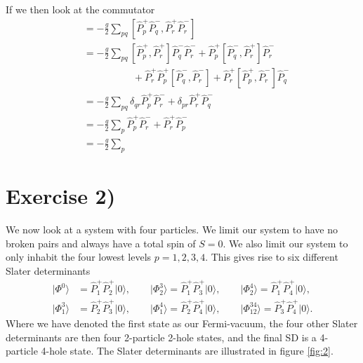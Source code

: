 \documentclass[a4paper, 11pt, notitlepage, english]{article}
\newcommand{\ket}[1]{|#1 \rangle}
\newcommand{\op}[1]{\hat{#1}}
\begin{document}
If we then look at the commutator
\begin{align*}
[\op{V}, \op{P}_r^+\op{P}_r^-] &= -\frac{g}{2}\sum_{pq} [\op{P}_p^+\op{P}_q^-, \op{P}_r^+\op{P}_r^-] \\
&= -\frac{g}{2}\sum_{pq} 
[\op{P}_p^+, \op{P}_r^+]\op{P}_q^-\op{P}_r^-
+\op{P}_p^+[\op{P}_q^-, \op{P}_r^+]\op{P}_r^- \\[-0.2cm]
&\qquad\qquad\quad +\op{P}_r^+\op{P}_p^+[\op{P}_q^-, \op{P}_r^-]
+\op{P}_r^+[\op{P}_p^+, \op{P}_r^-]\op{P}_q^- \\[0.1cm]
&= -\frac{g}{2}\sum_{pq} \delta_{qr} \op{P}_p^+\op{P}_r^- + \delta_{pr}\op{P}_r^+\op{P}_q^- \\
&= -\frac{g}{2}\sum_p \op{P}_p^+\op{P}_r^- + \op{P}_r^+\op{P}_p^- \\
&= -\frac{g}{2}\sum_p 
\end{align*}







\clearpage

\section*{Exercise 2)}

We now look at a system with four particles. We limit our system to have no broken pairs and always have a total spin of $S=0$. We also limit our system to only inhabit the four lowest levels $p=1,2,3,4$.  This gives rise to six different Slater determinants
\begin{align*}
	\ket{\Phi^{0}} &= \op{P}_1^+ \op{P}_2^+ \ket{0}, \qquad \ket{\Phi_2^{3}} = \op{P}_1^+ \op{P}_3^+ \ket{0}, \qquad \ket{\Phi_2^{4}} = \op{P}_1^+ \op{P}_4^+ \ket{0}, \\
	\ket{\Phi_1^{3}} &= \op{P}_2^+ \op{P}_3^+ \ket{0}, \qquad \ket{\Phi_1^{4}} = \op{P}_2^+ \op{P}_4^+ \ket{0}, \qquad \ket{\Phi_{12}^{34}} = \op{P}_3^+ \op{P}_4^+ \ket{0}.
\end{align*}
Where we have denoted the first state as our Fermi-vacuum, the four other Slater determinants are then four 2-particle 2-hole states, and the final SD is a 4-particle 4-hole state. The Slater determinants are illustrated in figure \ref{fig:2}.
\end{document}
